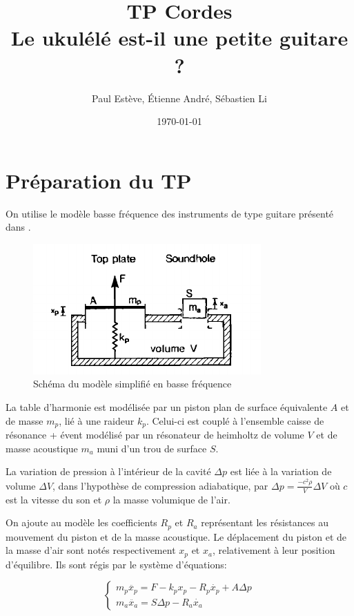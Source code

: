 \documentclass[atiam, article]{rapport} %
\title{TP Cordes\\Le ukulélé est-il une petite guitare ?}
\author{Paul Estève, Étienne André, Sébastien Li} %
\date{\today}
\begin{document}
\maketitle

\section{Préparation du TP}

On utilise le modèle basse fréquence des instruments de type guitare présenté dans \cite{10.1121/1.384814}.

\begin{figure}
  \begin{center}
    \includegraphics{cordes/schema-modele.png}
  \end{center}
  \caption{Schéma du modèle simplifié en basse fréquence\cite{10.1121/1.384814}}
  \label{fig:schema-bf}
\end{figure}

La table d'harmonie est modélisée par un piston plan de surface équivalente $A$ et de masse $m_p$, lié à une raideur $k_p$. Celui-ci est couplé à l'ensemble {caisse de résonance + évent} modélisé par un résonateur de heimholtz de volume $V$ et de masse acoustique $m_a$ muni d'un trou de surface $S$.

La variation de pression à l'intérieur de la cavité $\Delta p$ est liée à la variation de volume $\Delta V$, dans l'hypothèse de compression adiabatique, par $\Delta p = \frac{-c^2 \rho}{V} \Delta V$ où $c$ est la vitesse du son et $\rho$ la masse volumique de l'air.

On ajoute au modèle les coefficients $R_p$ et $R_a$ représentant les résistances au mouvement du piston et de la masse acoustique.
Le déplacement du piston et de la masse d'air sont notés respectivement $x_p$ et $x_a$, relativement à leur position d'équilibre. Ils sont régis par le système d'équations:

\begin{equation}
  \begin{cases}
    m_p \ddot{x_p} = F - k_p x_p - R_p \dot{x_p} + A \Delta p  \\
    m_a \ddot{x_a} = S \Delta p - R_a \dot{x_a}    
  \end{cases}
\end{equation}
\end{document}
